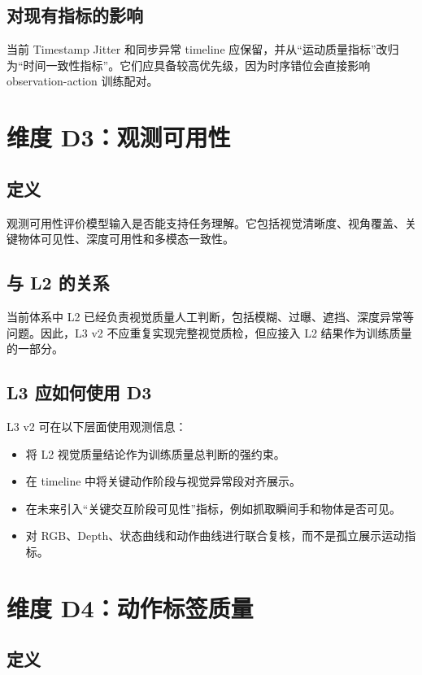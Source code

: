 \documentclass[UTF8,zihao=-4]{ctexart}
\begin{document}
\subsection{对现有指标的影响}

当前 Timestamp Jitter 和同步异常 timeline 应保留，并从“运动质量指标”改归为“时间一致性指标”。它们应具备较高优先级，因为时序错位会直接影响 observation-action 训练配对。

\section{维度 D3：观测可用性}

\subsection{定义}

观测可用性评价模型输入是否能支持任务理解。它包括视觉清晰度、视角覆盖、关键物体可见性、深度可用性和多模态一致性。

\subsection{与 L2 的关系}

当前体系中 L2 已经负责视觉质量人工判断，包括模糊、过曝、遮挡、深度异常等问题。因此，L3 v2 不应重复实现完整视觉质检，但应接入 L2 结果作为训练质量的一部分。

\subsection{L3 应如何使用 D3}

L3 v2 可在以下层面使用观测信息：

\begin{itemize}
  \item 将 L2 视觉质量结论作为训练质量总判断的强约束。
  \item 在 timeline 中将关键动作阶段与视觉异常段对齐展示。
  \item 在未来引入“关键交互阶段可见性”指标，例如抓取瞬间手和物体是否可见。
  \item 对 RGB、Depth、状态曲线和动作曲线进行联合复核，而不是孤立展示运动指标。
\end{itemize}

\section{维度 D4：动作标签质量}

\subsection{定义}
\end{document}
